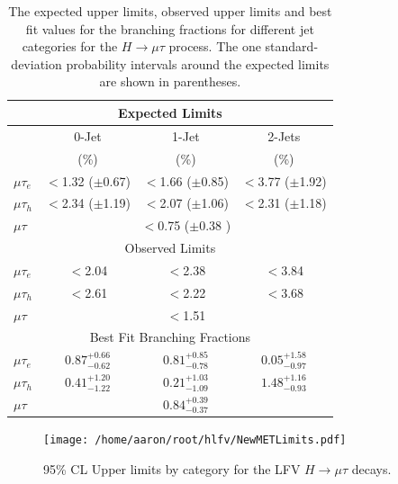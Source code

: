\documentclass[oneside, letterpaper, oldfontcommands]{memoir}
\begin{document}
\begin{table}[hbtp]
 \centering
  \caption{The expected upper limits, observed upper limits and best fit values for the branching fractions for different
    jet categories for the $H \rightarrow \mu \tau$  process.
    The one standard-deviation probability intervals around the expected limits are shown in parentheses.}
  \label{tab:expected_limits}
   \begin{tabular}{l|c|c|c} \hline
\multicolumn{4}{c}{Expected Limits} \\ \hline
                       &  \multicolumn{1}{c|}{0-Jet}   & \multicolumn{1}{c}{1-Jet}    &  \multicolumn{1}{|c}{2-Jets}                 \\
                       & (\%)                     & (\%)                     & (\%)                    \\ \cline{2-4}
          $\mu\tau_{e}$  &  $<$1.32 ($\pm$0.67)   &  $<$1.66 ($\pm$0.85)   &  $<$3.77 ($\pm$1.92)  \\
      $\mu\tau_{h}$    &  $<$2.34 ($\pm$1.19)   &  $<$2.07 ($\pm$1.06)   &  $<$2.31 ($\pm$1.18)  \\ \hline
            $\mu\tau$  &        \multicolumn{3}{c}{  $<$0.75 ($\pm$0.38 ) }                              \\ \hline
\multicolumn{4}{c}{Observed Limits} \\ \hline
          $\mu\tau_{e}$  &  $<$2.04                &  $<$2.38                &  $<$3.84   \\
      $\mu\tau_{h}$    &  $<$2.61                &  $<$2.22                &  $<$3.68   \\ \hline
            $\mu\tau$  & \multicolumn{3}{c}{  $<$1.51 }   \\ \hline
\multicolumn{4}{c}{Best Fit Branching Fractions} \\ \hline
      \rule[-5pt]{0pt}{17pt}
      $\mu\tau_{e}$  &  $0.87^{+0.66}_{-0.62}$  &  $0.81^{+0.85}_{-0.78}$  &  $0.05^{+1.58}_{-0.97}$  \\
      \rule[-5pt]{0pt}{17pt}
      $\mu\tau_{h}$    &  $0.41^{+1.20}_{-1.22}$  &  $0.21^{+1.03}_{-1.09}$  &  $1.48^{+1.16}_{-0.93}$  \\ \hline
      \rule[-5pt]{0pt}{17pt}
      $\mu\tau$  & \multicolumn{3}{c}{ $0.84^{+0.39}_{-0.37}$ }   \\ \hline
  \end{tabular}
\end{table}
\begin{figure}[hbtp]\centering
\texttt{[image: /home/aaron/root/hlfv/NewMETLimits.pdf]}
 \caption{95\% CL Upper limits by category for the LFV $H \rightarrow \mu \tau$  decays.}
 \label{fig:limits_summary}\end{figure}
\end{document}
